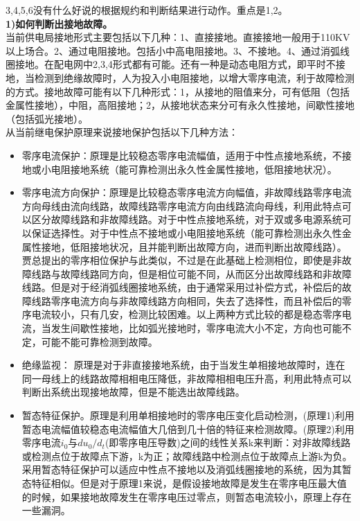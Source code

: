\documentclass{article}
\begin{document}
\begin{CJK}{UTF8}{gbsn}
\begin{enumerate}
	3,4,5,6没有什么好说的根据规约和判断结果进行动作。重点是1,2。\\
	\textbf{1)如何判断出接地故障。}\\
	当前供电局接地形式主要包括以下几种：1、直接接地。直接接地一般用于110KV以上场合。2、通过电阻接地。包括小中高电阻接地。3、不接地。4、通过消弧线圈接地。在配电网中2,3,4形式都有可能。还有一种是动态电阻方式，即平时不接地，当检测到绝缘故障时，人为投入小电阻接地，以增大零序电流，利于故障检测的方式。接地故障可能有以下几种形式：1，从接地的阻值来分，可有低阻（包括金属性接地），中阻，高阻接地；2，从接地状态来分可有永久性接地，间歇性接地（包括弧光接地）。\\
	从当前继电保护原理来说接地保护包括以下几种方法：
	\begin{itemize}
			\item 零序电流保护：原理是比较稳态零序电流幅值，适用于中性点接地系统，不接地或小电阻接地系统（能可靠检测出永久性金属性接地，低阻接地状况）。
			\item 零序电流方向保护：原理是比较稳态零序电流方向幅值，非故障线路零序电流方向母线由流向线路，故障线路零序电流方向由线路流向母线，利用此特点可以区分故障线路和非故障线路。对于中性点接地系统，对于双或多电源系统可以保证选择性。对于中性点不接地或小电阻接地系统（能可靠检测出永久性金属性接地，低阻接地状况，且并能判断出故障方向，进而判断出故障线路）。贾总提出的零序相位保护与此类似，不过是在此基础上检测相位，即使是非故障线路与故障线路同方向，但是相位可能不同，从而区分出故障线路和非故障线路。但是对于经消弧线圈接地系统，由于通常采用过补偿方式，补偿后的故障线路零序电流方向与非故障线路方向相同，失去了选择性，而且补偿后的零序电流较小，只有几安，检测比较困难。以上两种方式比较的都是稳态零序电流，当发生间歇性接地，比如弧光接地时，零序电流大小不定，方向也可能不定，可能不能可靠检测到故障。
			\item 绝缘监视： 原理是对于非直接接地系统，由于当发生单相接地故障时，连在同一母线上的线路故障相相电压降低，非故障相相电压升高，利用此特点可以判断出系统出现接地故障，但是不能选出故障线路。
			\item 暂态特征保护\cite{p1}。原理是利用单相接地时的零序电压变化启动检测，(原理1)利用暂态电流幅值较稳态电流幅值大几倍到几十倍的特征来检测故障。(原理2)利用零序电流$i_0$与$du_0/d_t$(即零序电压导数)之间的线性关系k来判断：对非故障线路或检测点位于故障点下游，k为正；故障线路中检测点位于故障点上游k为负。采用暂态特征保护可以适应中性点不接地以及消弧线圈接地的系统，因为其暂态特征相似。但是对于原理1来说，是假设接地故障是发生在零序电压最大值的时候，如果接地故障发生在零序电压过零点，则暂态电流较小，原理上存在一些漏洞。\\

\end{itemize}
\end{enumerate}
\end{CJK}
\end{document}
